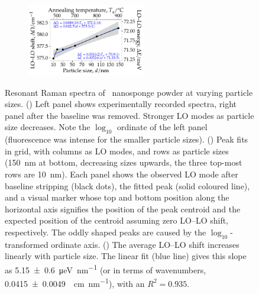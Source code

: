 \documentclass[draft,webedition,openright,titles,swedish,english]{LuaUUThesis}\usepackage[]{graphicx}\usepackage[]{xcolor}
\newenvironment{knitrout}{}{} %
\begin{document}
\begin{figure}[tbp]
\begin{subfigure}{0.55\textwidth}
\begin{knitrout}
{}


\end{knitrout}
\caption{}
\label{fig:P25-UVRaman-peaks-in-grid}
\end{subfigure}%
\,%
\begin{subfigure}{0.43\textwidth}
\centering
\begin{knitrout}\scriptsize
{}\color{fgcolor}

{\centering \includegraphics[width=2.03in]{figure/0525P-fig-UVRaman-meanLOLO-vs-diameter-1} 

}


\end{knitrout}
\caption{}
\label{fig:P25-UVRaman-meanLOLO-vs-diameter}
\end{subfigure}%
\caption[Resonant Raman spectra]{%
   Resonant Raman spectra of \ZnO\ nanosponge powder at varying particle sizes.
   ()
   Left panel shows experimentally recorded spectra,
   right panel after the baseline was removed.
   Stronger LO modes as particle size decreases.
   Note the $\log_{10}$ ordinate of the left panel
   (fluorescence was intense for the smaller particle sizes).
   ()
   Peak fits in grid, with columns as LO modes, and rows as particle sizes
   (\qty{150}{\nm} at bottom, decreasing sizes upwards, the three top-most rows are \qty{10}{\nm}).
   Each panel shows the observed LO mode after baseline stripping (black dots),
   the fitted peak (solid coloured line), and a visual marker whose top and bottom
   position along the horizontal axis signifies the position of the peak centroid
   and the expected position of the centroid assuming zero LO--LO shift, respectively.
   The oddly shaped peaks are caused by the $\log_{10}$-transformed ordinate axis.
   ()
   The average LO--LO shift increases linearly with particle size.
   The linear fit (blue line) gives this slope as
   \qty{5.15\pm0.6}{\micro\eV\per\nm}
   (or in terms of wavenumbers,
   \qty{0.0415\pm0.0049}{\per\cm\per\nm}),
   with an $R^2=\num{0.935}$.
}
\label{fig:P25-UVRaman-spectra}
\end{figure}
\end{document}
